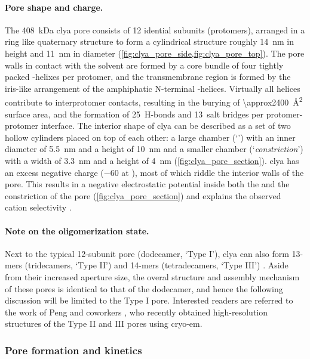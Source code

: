 \paragraph{Pore shape and charge.}
%
The \SI{408}{\kilo\dalton} \gls{clya} pore consists of 12 idential subunits (protomers), arranged in a ring
like quaternary structure to form a cylindrical structure roughly \SI{14}{\nm} in height and \SI{11}{\nm} in
diameter (\cref{fig:clya_pore_side,fig:clya_pore_top}). The pore walls in contact with the solvent are formed
by a core bundle of four tightly packed \ta-helixes per protomer, and the transmembrane region is formed by
the iris-like arrangement of the amphiphatic N-terminal \ta-helices. Virtually all helices contribute to
interprotomer contacts, resulting in the burying of \SI{\approx2400}{\square\angstrom} surface area, and the
formation of 25~H-bonds and 13~salt bridges per protomer-protomer interface. The interior shape of \gls{clya}
can be described as a set of two hollow cylinders placed on top of each other: a large \cisi{} chamber
(`\lumen{}') with an inner diameter of \SI{5.5}{\nm} and a height of \SI{10}{\nm} and a smaller \transi{}
chamber (`\textit{constriction}') with a width of \SI{3.3}{\nm} and a height of \SI{4}{\nm}
(\cref{fig:clya_pore_section}). \Gls{clya} has an excess negative charge (\SI{-60}{\ec} at ), most of
which riddle the interior walls of the pore. This results in a negative electrostatic potential inside both
the \lumen{} and the constriction of the pore (\cref{fig:clya_pore_section}) and explains the observed cation
selectivity \cite{Soskine-2012,Franceschini-2016}.

\paragraph{Note on the oligomerization state.}
%
Next to the typical 12-subunit pore (dodecamer, `Type I'), \gls{clya} can also form 13-mers (tridecamers,
`Type II') and 14-mers (tetradecamers, `Type III') \cite{Soskine-2013}. Aside from their increased aperture
size, the overal structure and assembly mechanism of these pores is identical to that of the dodecamer, and
hence the following discussion will be limited to the Type I pore. Interested readers are referred to the work
of Peng and coworkers \cite{Peng-2019}, who recently obtained high-resolution structures of the Type II and
III pores using \gls{cryo-em}.


\subsubsection{Pore formation and kinetics}

